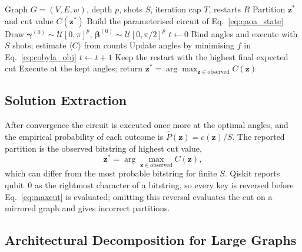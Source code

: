 \documentclass[pdflatex,sn-mathphys-num]{sn-jnl}
\theoremstyle{thmstyleone}
\theoremstyle{thmstyletwo}
\theoremstyle{thmstylethree}
\begin{document}
\begin{algorithm}[t]
\caption{Shot-based QAOA training for weighted Max-Cut}\label{alg:qaoa}
\begin{algorithmic}[1]
\Require Graph $G=(V,E,w)$, depth $p$, shots $S$, iteration cap $T$, restarts $R$
\Ensure Partition $\mathbf{z}^*$ and cut value $C(\mathbf{z}^*)$
\State Build the parameterised circuit of Eq.~\eqref{eq:qaoa_state}
  \State Draw $\boldsymbol{\gamma}^{(0)}\sim\mathcal{U}[0,\pi]^{p}$, $\boldsymbol{\beta}^{(0)}\sim\mathcal{U}[0,\pi/2]^{p}$
  \State $t\leftarrow0$
    \State Bind angles and execute with $S$ shots; estimate $\langle C\rangle$ from counts
    \State Update angles by minimising $f$ in Eq.~\eqref{eq:cobyla_obj}
    \State $t\leftarrow t+1$
  \EndWhile
\EndFor
\State Keep the restart with the highest final expected cut
\State Execute at the kept angles; return $\mathbf{z}^*=\arg\max_{\mathbf{z}\in\text{observed}} C(\mathbf{z})$
\end{algorithmic}
\end{algorithm}

\subsection{Solution Extraction}\label{sec:extraction}

After convergence the circuit is executed once more at the optimal angles, and the empirical probability of each outcome is $\hat P(\mathbf{z})=c(\mathbf{z})/S$. The reported partition is the observed bitstring of highest cut value,
\begin{equation}
  \mathbf{z}^{*}=\arg\max_{\mathbf{z}\in\text{observed}} C(\mathbf{z}),
  \label{eq:extract}
\end{equation}
which can differ from the most probable bitstring for finite $S$. Qiskit reports qubit~0 as the rightmost character of a bitstring, so every key is reversed before Eq.~\eqref{eq:maxcut} is evaluated; omitting this reversal evaluates the cut on a mirrored graph and gives incorrect partitions.

\subsection{Architectural Decomposition for Large Graphs}\label{sec:blocks}
\end{document}
